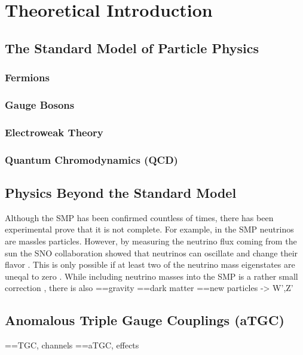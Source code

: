 \chapter{Theoretical Introduction}
\label{chap::TheoreticalIntroduction}

\section{The Standard Model of Particle Physics}
\subsection{Fermions}
\subsection{Gauge Bosons}
\subsection{Electroweak Theory}
\subsection{Quantum Chromodynamics (QCD)}
\section{Physics Beyond the Standard Model}
Although the SMP has been confirmed countless of times, there has been experimental prove that it is not complete. For example, in the SMP neutrinos are massles particles. However, by measuring the neutrino flux coming from the sun the SNO collaboration showed that neutrinos can oscillate and change their flavor \cite{SNO}. This is only possible if at least two of the neutrino mass eigenstates are uneqal to zero \cite{}. While including neutrino masses into the SMP is a rather small correction \cite{numassesSMP}, there is also 
==gravity
==dark matter
==new particles -> W',Z'
\section{Anomalous Triple Gauge Couplings (aTGC)}
==TGC, channels
==aTGC, effects
